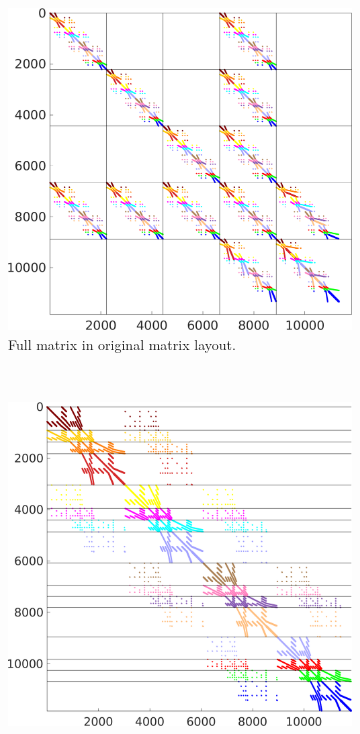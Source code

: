 \begin{figure}%
  \centering%
  \begin{subfigure}[t]{0.49\textwidth}%
    \centering%
    \includegraphics[width=\textwidth]{images/implementation/16_original_matrix.png}
    \caption{Full matrix in original matrix layout.}%
    \label{fig:16_original_matrix}%
  \end{subfigure}
  \,
  \begin{subfigure}[t]{0.49\textwidth}%
    \centering%
    \includegraphics[width=\textwidth]{images/implementation/16_reordered_matrix.png}

\end{subfigure}
\end{figure}
